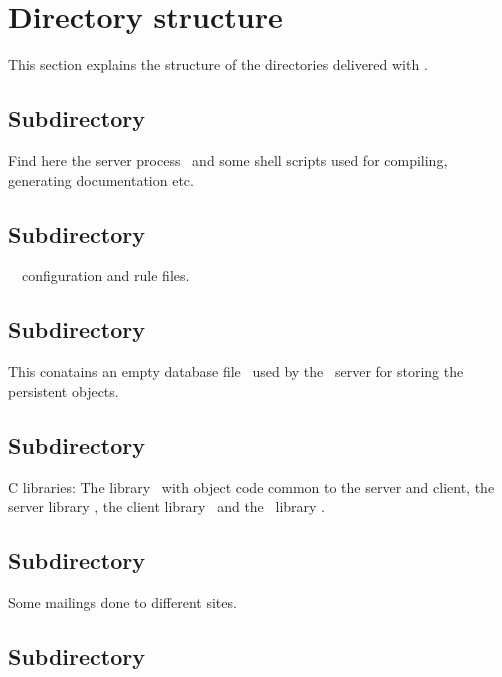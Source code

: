 \section{Directory structure}

This section explains the structure of the directories delivered with
\plobwoexcl.

\subsection*{Subdirectory \protect{}}

Find here the server process \ and some shell scripts used
for compiling, generating documentation etc.

\subsection*{Subdirectory \protect{}}

\unix\ \ configuration and rule files.

\subsection*{Subdirectory \protect{}}

This conatains an empty database file \ used
by the \plob\ server for storing the persistent objects.

\subsection*{Subdirectory \protect{}}

C libraries: The library \ with object code common to
the server and client, the server library , the
client library \ and the \postore\ library
.

\subsection*{Subdirectory \protect{}}

Some mailings done to different sites.

\subsection*{Subdirectory \protect{}}

